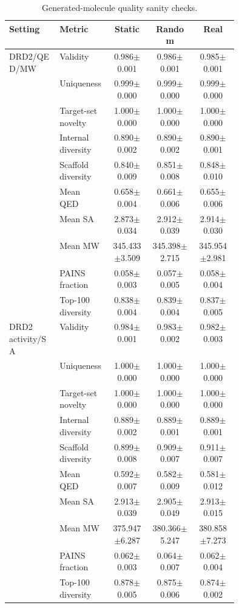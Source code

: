 \documentclass[referee,lineno,pdflatex,sn-basic]{sn-jnl}
\theoremstyle{thmstyleone}%
\theoremstyle{thmstyletwo}%
\theoremstyle{thmstylethree}%
\begin{document}
\begin{table}[h]
\caption{Generated-molecule quality sanity checks.}
\label{tab:molecule_quality}
\centering
\footnotesize
\setlength{\tabcolsep}{3pt}
\begin{tabularx}{\linewidth}{@{}p{0.22\linewidth}p{0.22\linewidth}ccc@{}}
\toprule
Setting & Metric & Static & Random & Real\\
\midrule
DRD2/QED/MW & Validity & 0.986$\pm$0.001 & 0.986$\pm$0.001 & 0.985$\pm$0.001\\
 & Uniqueness & 0.999$\pm$0.000 & 0.999$\pm$0.000 & 0.999$\pm$0.000\\
 & Target-set novelty & 1.000$\pm$0.000 & 1.000$\pm$0.000 & 1.000$\pm$0.000\\
 & Internal diversity & 0.890$\pm$0.002 & 0.890$\pm$0.002 & 0.890$\pm$0.001\\
 & Scaffold diversity & 0.840$\pm$0.009 & 0.851$\pm$0.008 & 0.848$\pm$0.010\\
 & Mean QED & 0.658$\pm$0.004 & 0.661$\pm$0.006 & 0.655$\pm$0.006\\
 & Mean SA & 2.873$\pm$0.034 & 2.912$\pm$0.039 & 2.914$\pm$0.030\\
 & Mean MW & 345.433$\pm$3.509 & 345.398$\pm$2.715 & 345.954$\pm$2.981\\
 & PAINS fraction & 0.058$\pm$0.003 & 0.057$\pm$0.005 & 0.058$\pm$0.004\\
 & Top-100 diversity & 0.838$\pm$0.004 & 0.839$\pm$0.004 & 0.837$\pm$0.005\\
\addlinespace
DRD2 activity/SA & Validity & 0.984$\pm$0.001 & 0.983$\pm$0.002 & 0.982$\pm$0.003\\
 & Uniqueness & 1.000$\pm$0.000 & 1.000$\pm$0.000 & 1.000$\pm$0.000\\
 & Target-set novelty & 1.000$\pm$0.000 & 1.000$\pm$0.000 & 1.000$\pm$0.000\\
 & Internal diversity & 0.889$\pm$0.002 & 0.889$\pm$0.001 & 0.889$\pm$0.001\\
 & Scaffold diversity & 0.899$\pm$0.008 & 0.909$\pm$0.007 & 0.911$\pm$0.007\\
 & Mean QED & 0.592$\pm$0.007 & 0.582$\pm$0.009 & 0.581$\pm$0.012\\
 & Mean SA & 2.913$\pm$0.039 & 2.905$\pm$0.049 & 2.913$\pm$0.015\\
 & Mean MW & 375.947$\pm$6.287 & 380.366$\pm$5.247 & 380.858$\pm$7.273\\
 & PAINS fraction & 0.062$\pm$0.003 & 0.064$\pm$0.007 & 0.062$\pm$0.004\\
 & Top-100 diversity & 0.878$\pm$0.005 & 0.875$\pm$0.006 & 0.874$\pm$0.002\\

\end{tabularx}
\end{table}
\end{document}
